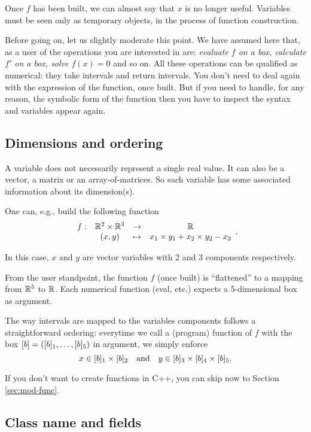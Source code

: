 Once $f$ has been built, we can almost say that $x$ is no longer useful.
Variables must be seen only as temporary objects, in the process of function construction.

Before going on, let us slightly moderate this point.
We have assumed here that, as a user of \ibex the operations you are interested in are: {\it evaluate $f$ on a box, 
calculate $f'$ on a box, solve $f(x)=0$} and so on. All these operations can be qualified as numerical: they take
intervals and return intervals. You don't need to deal again with the expression of the function, once built.
But if you need to handle, for any reason, the symbolic form of the function then you have to inspect the syntax
and variables appear again.

\subsection{Dimensions and ordering}

A variable does not necessarily represent a single real value.
It can also be a vector, a matrix or an array-of-matrices. So each variable has some associated information about
its dimension(s). 

One can, e.g., build the following function 
$$\begin{array}{cccc}
f: & \mathbb{R}^2\times\mathbb{R}^3 & \to & \mathbb{R}\\
   &  (x,y) & \mapsto & x_1\times y_1+x_2\times y_2 - x_3
\end{array}.$$

In this case, $x$ and $y$ are vector variables with 2 and 3 components respectively.

From the user standpoint, the function $f$ (once built) is ``flattened'' to a mapping from $\mathbb{R}^5$ to $\mathbb{R}$.
Each numerical function (eval, etc.) expects a 5-dimensional box as argument.

The way intervals are mapped to the variables components follows a straightforward ordering:
everytime we call a (program) function of $f$ with the box $[b]=([b]_1,\ldots,[b]_5)$ in argument, we simply enforce
$$x\in[b]_1\times[b]_2 \quad \mbox{and} \quad y\in[b]_3\times[b]_4\times[b]_5.$$

If you don't want to create functions in C++, you can skip now to Section \ref{sec:mod-func}.

\subsection{Class name and fields}

